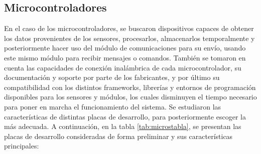 \subsection{Microcontroladores}

En el caso de los microcontroladores, se buscaron dispositivos capaces de obtener los datos provenientes de los sensores, procesarlos, almacenarlos temporalmente y posteriormente hacer uso del módulo de comunicaciones para su envío, usando este mismo módulo para recibir mensajes o comandos. También se tomaron en cuenta las capacidades de conexión inalámbrica de cada microcontrolador, su documentación y soporte por parte de los fabricantes, y por último su compatibilidad con los distintos frameworks, librerías y entornos de programación disponibles para los sensores y módulos, los cuales disminuyen el tiempo necesario para poner en marcha el funcionamiento del sistema. Se estudiaron las características de distintas placas de desarrollo, para posteriormente escoger la más adecuada. A continuación, en la tabla \ref{tab:microstabla}, se presentan las placas de desarrollo consideradas de forma preliminar y sus características principales:

